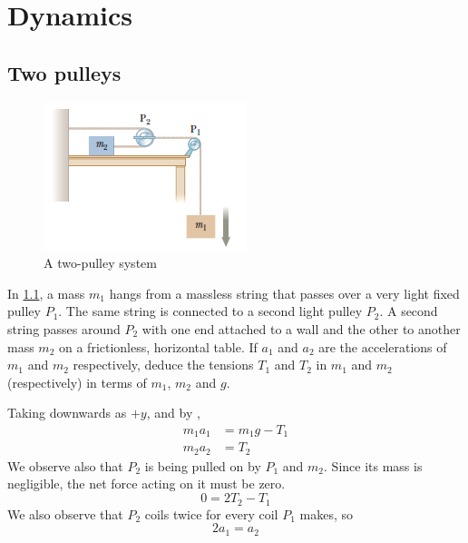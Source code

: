 \chapter{Dynamics}

\section{Two pulleys}
\begin{figure}
  \includegraphics{assets/twopulleys.png}
  \caption{A two-pulley system}
  \label{fig:twopulleys}
\end{figure}

\begin{problem}
  In \cref{fig:twopulleys}, a mass \(m_1\) hangs from a massless string
  that passes over a very light fixed pulley \(P_1\).
  The same string is connected to a second light pulley \(P_2\). A
  second string passes around \(P_2\) with one end
  attached to a wall and the other to another mass \(m_2\) on a
  frictionless, horizontal table.
  If \(a_1\) and \(a_2\) are the accelerations of \(m_1\) and
  \(m_2\) respectively, deduce the tensions \(T_1\) and \(T_2\) in \(m_1\) and
  \(m_2\) (respectively) in terms of \(m_1\), \(m_2\) and \(g\).
\end{problem}

Taking downwards as \(+y\), and by ,
\begin{align}
  \label{eq:m1a1}
  m_1a_1 &= m_1g-T_1 \\
  m_2a_2 &= T_2
  \label{eq:m2a2}
\end{align}
We observe also that \(P_2\) is being pulled on by \(P_1\) and
\(m_2\). Since its
mass is negligible, the net force acting on it must be zero.
\begin{equation}
  0 = 2T_2 - T_1
  \label{eq:t1t2}
\end{equation}
We also observe that \(P_2\) coils twice for every coil \(P_1\) makes, so
\begin{equation}
  2a_1 = a_2
  \label{eq:a1a2}
\end{equation}

